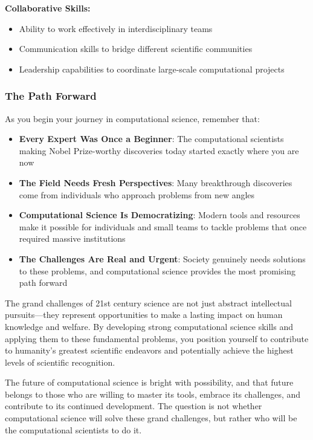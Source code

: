 \textbf{Collaborative Skills:}
\begin{itemize}
    \item Ability to work effectively in interdisciplinary teams
    \item Communication skills to bridge different scientific communities
    \item Leadership capabilities to coordinate large-scale computational projects
\end{itemize}

\subsubsection{The Path Forward}

As you begin your journey in computational science, remember that:

\begin{itemize}
    \item \textbf{Every Expert Was Once a Beginner}: The computational scientists making Nobel Prize-worthy discoveries today started exactly where you are now
    \item \textbf{The Field Needs Fresh Perspectives}: Many breakthrough discoveries come from individuals who approach problems from new angles
    \item \textbf{Computational Science Is Democratizing}: Modern tools and resources make it possible for individuals and small teams to tackle problems that once required massive institutions
    \item \textbf{The Challenges Are Real and Urgent}: Society genuinely needs solutions to these problems, and computational science provides the most promising path forward
\end{itemize}

The grand challenges of 21st century science are not just abstract intellectual pursuits—they represent opportunities to make a lasting impact on human knowledge and welfare. By developing strong computational science skills and applying them to these fundamental problems, you position yourself to contribute to humanity's greatest scientific endeavors and potentially achieve the highest levels of scientific recognition.

The future of computational science is bright with possibility, and that future belongs to those who are willing to master its tools, embrace its challenges, and contribute to its continued development. The question is not whether computational science will solve these grand challenges, but rather who will be the computational scientists to do it.


